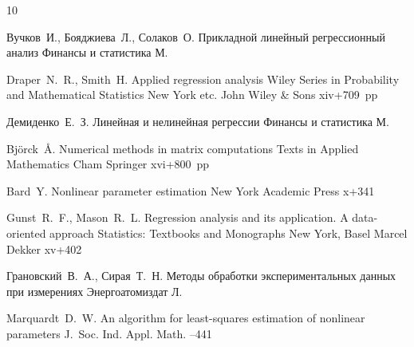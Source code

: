 \begin{thebibliography}{10}

\by Вучков~И., Бояджиева~Л., Солаков~О.
\book Прикладной линейный регрессионный анализ
\publ Финансы и статистика
\publaddr М.



\by Draper~N.~R., Smith~H.  
\book Applied regression analysis
\serial Wiley Series in Probability and Mathematical Statistics
\publaddr New York etc.
\publ John Wiley \& Sons
\totalpages xiv+709~pp \nofrills
{}

\by Демиденко~Е.~З.
\book Линейная и нелинейная регрессии
\publ Финансы и статистика
\publaddr М.

\by Bj\"orck~\AA.
\book Numerical methods in matrix computations
\serial Texts in Applied Mathematics 
\publaddr Cham
\publ Springer 
\totalpages xvi+800~pp \nofrills 
{}

\by Bard~Y.
\book Nonlinear parameter estimation
\publaddr New York
\publ Academic Press
\totalpages x+341 


\by Gunst~R.~F., Mason~R.~L.
\book Regression analysis and its application. A data-oriented approach
\serial Statistics: Textbooks and Monographs
\publaddr New York, Basel
\publ Marcel Dekker
\totalpages xv+402 


\by Грановский~В.~А., Сирая~Т.~Н. 
\book Методы обработки экспериментальных данных при измерениях
\publ Энергоатомиздат
\publaddr Л.



\by Marquardt~D.~W.  
\paper An algorithm for least-squares estimation of nonlinear parameters
\jour J.~Soc. Ind. Appl. Math. 
--441 



\end{thebibliography}
